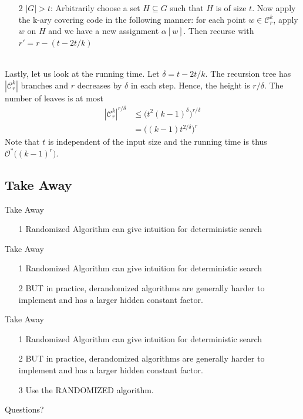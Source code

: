 \documentclass[pdf] {beamer}
\newcommand{\cc}{\mathcal{C}}
\renewcommand{\O}{\mathcal{O}^*}
\begin{document}
	\begin{frame}
		\begin{enumerate}
			\item[2] $|G| > t$: Arbitrarily choose a set $H \subseteq G$ such that $H$ is of size $t$. Now apply the k-ary covering code in the following manner: for each point $w \in \cc_r^k$, apply $w$ on $H$ and we have a new assignment $\alpha[w]$. Then recurse with $r' = r - (t - 2t/k)$\\~\
		\end{enumerate}
	\end{frame}	
	\begin{frame}
		Lastly, let us look at the running time. Let $\delta = t - 2t/k$. The recursion tree has $|\cc_r^k|$ branches and $r$ decreases by $\delta$ in each step. Hence, the height is ${r/\delta}$. The number of leaves is at most
		\begin{align*}
		|\mathcal{C}_r^k|^{r/\delta} &\leq \big(t^{2}(k-1)^{\delta}\big)^{r/\delta}\\
		&= \big((k-1)t^{2/\delta}\big)^{r}
		\end{align*}
		Note that $t$ is independent of the input size and the running time is thus $\O\big((k-1)^r\big)$.
	\end{frame}

\subsection{Take Away}
\begin{frame}{Take Away}
	\begin{enumerate}
		\item[1] Randomized Algorithm can give intuition for deterministic search
	\end{enumerate}
\end{frame}
\begin{frame}{Take Away}
\begin{enumerate}
	\item[1] Randomized Algorithm can give intuition for deterministic search
	\item[2] BUT in practice, derandomized algorithms are generally harder to implement and has a larger hidden constant factor. 
\end{enumerate}
\end{frame}\begin{frame}{Take Away}
\begin{enumerate}
\item[1] Randomized Algorithm can give intuition for deterministic search
\item[2] BUT in practice, derandomized algorithms are generally harder to implement and has a larger hidden constant factor. 
\item[3] Use the RANDOMIZED algorithm.
\end{enumerate}
\end{frame}
	\begin{frame}
Questions?
\end{frame}
\end{document}
